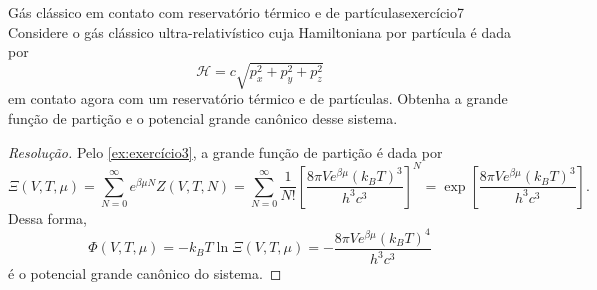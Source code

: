 \begin{exercício}{Gás clássico em contato com reservatório térmico e de partículas}{exercício7}
    Considere o gás clássico ultra-relativístico cuja Hamiltoniana por partícula é dada por
    \begin{equation*}
        \mathcal{H} = c\sqrt{p_x^2 + p_y^2 + p_z^2}
    \end{equation*}
    em contato agora com um reservatório térmico e de partículas. Obtenha a grande função de partição e o potencial grande canônico desse sistema.
\end{exercício}
\begin{proof}[Resolução]
    Pelo \cref{ex:exercício3}, a grande função de partição é dada por
    \begin{equation*}
        \Xi(V, T, \mu) = \sum_{N = 0}^\infty e^{\beta \mu N} Z(V, T, N) = \sum_{N=0}^\infty \frac{1}{N!}\left[\frac{8\pi Ve^{\beta \mu}(k_BT)^3}{h^3 c^3}\right]^N = \exp\left[\frac{8\pi Ve^{\beta \mu}(k_BT)^3}{h^3 c^3}\right].
    \end{equation*}
    Dessa forma,
    \begin{equation*}
        \Phi(V, T, \mu) = -k_B T \ln\Xi(V, T, \mu) = -\frac{8\pi V e^{\beta \mu}(k_BT)^4}{h^3 c^3}
    \end{equation*}
    é o potencial grande canônico do sistema.
\end{proof}
